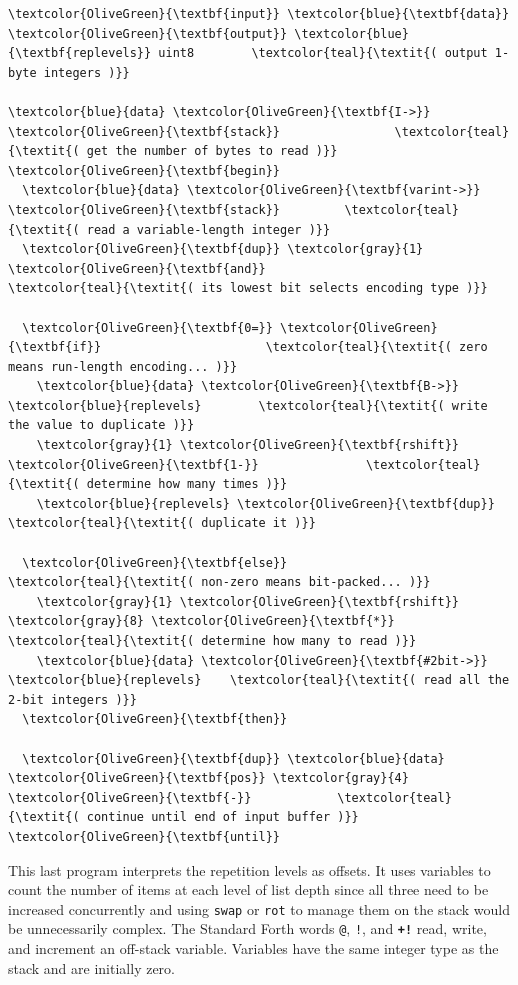 \documentclass{webofc}
\begin{document}
\begin{Verbatim}[commandchars=\\\{\}]
\textcolor{OliveGreen}{\textbf{input}} \textcolor{blue}{\textbf{data}}
\textcolor{OliveGreen}{\textbf{output}} \textcolor{blue}{\textbf{replevels}} uint8        \textcolor{teal}{\textit{( output 1-byte integers )}}

\textcolor{blue}{data} \textcolor{OliveGreen}{\textbf{I->}} \textcolor{OliveGreen}{\textbf{stack}}                \textcolor{teal}{\textit{( get the number of bytes to read )}}
\textcolor{OliveGreen}{\textbf{begin}}
  \textcolor{blue}{data} \textcolor{OliveGreen}{\textbf{varint->}} \textcolor{OliveGreen}{\textbf{stack}}         \textcolor{teal}{\textit{( read a variable-length integer )}}
  \textcolor{OliveGreen}{\textbf{dup}} \textcolor{gray}{1} \textcolor{OliveGreen}{\textbf{and}}                   \textcolor{teal}{\textit{( its lowest bit selects encoding type )}}

  \textcolor{OliveGreen}{\textbf{0=}} \textcolor{OliveGreen}{\textbf{if}}                       \textcolor{teal}{\textit{( zero means run-length encoding... )}}
    \textcolor{blue}{data} \textcolor{OliveGreen}{\textbf{B->}} \textcolor{blue}{replevels}        \textcolor{teal}{\textit{( write the value to duplicate )}}
    \textcolor{gray}{1} \textcolor{OliveGreen}{\textbf{rshift}} \textcolor{OliveGreen}{\textbf{1-}}               \textcolor{teal}{\textit{( determine how many times )}}
    \textcolor{blue}{replevels} \textcolor{OliveGreen}{\textbf{dup}}             \textcolor{teal}{\textit{( duplicate it )}}

  \textcolor{OliveGreen}{\textbf{else}}                        \textcolor{teal}{\textit{( non-zero means bit-packed... )}}
    \textcolor{gray}{1} \textcolor{OliveGreen}{\textbf{rshift}} \textcolor{gray}{8} \textcolor{OliveGreen}{\textbf{*}}              \textcolor{teal}{\textit{( determine how many to read )}}
    \textcolor{blue}{data} \textcolor{OliveGreen}{\textbf{#2bit->}} \textcolor{blue}{replevels}    \textcolor{teal}{\textit{( read all the 2-bit integers )}}
  \textcolor{OliveGreen}{\textbf{then}}

  \textcolor{OliveGreen}{\textbf{dup}} \textcolor{blue}{data} \textcolor{OliveGreen}{\textbf{pos}} \textcolor{gray}{4} \textcolor{OliveGreen}{\textbf{-}}            \textcolor{teal}{\textit{( continue until end of input buffer )}}
\textcolor{OliveGreen}{\textbf{until}}
\end{Verbatim}

\noindent This last program interprets the repetition levels as offsets. It uses variables to count the number of items at each level of list depth since all three need to be increased concurrently and using \texttt{swap} or \texttt{rot} to manage them on the stack would be unnecessarily complex. The Standard Forth words \texttt{@}, \texttt{!}, and \textcolor{OliveGreen}{\tt\textbf{+!}} read, write, and increment an off-stack variable. Variables have the same integer type as the stack and are initially zero.
\end{document}
